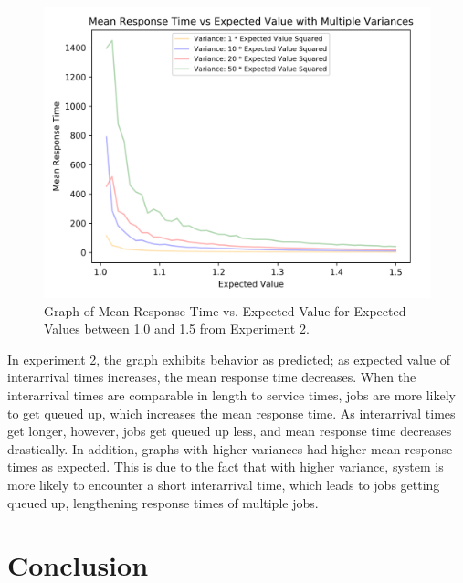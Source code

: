 \documentclass[12pt]{article}
\begin{document}
\begin{figure}[H]
\includegraphics[width=\linewidth]{Analysis2_1_1.png}
\caption{Graph of Mean Response Time vs. Expected Value for Expected Values between 1.0 and 1.5 from Experiment 2.}
\end{figure}

In experiment 2, the graph exhibits behavior as predicted; as expected value of interarrival times increases, the mean response time decreases. When the interarrival times are comparable in length to service times, jobs are more likely to get queued up, which increases the mean response time. As interarrival times get longer, however, jobs get queued up less, and mean response time decreases drastically. In addition, graphs with higher variances had higher mean response times as expected. This is due to the fact that with higher variance, system is more likely to encounter a short interarrival time, which leads to jobs getting queued up, lengthening response times of multiple jobs. 

\section{Conclusion}
\end{document}
